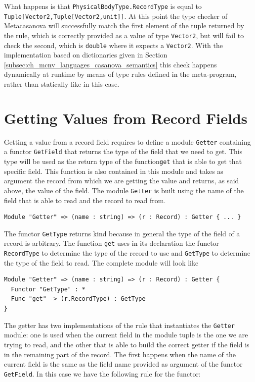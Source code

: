 \noindent
What happens is that \texttt{PhysicalBodyType.RecordType} is equal to\\ \texttt{Tuple[Vector2,Tuple[Vector2,unit]]}. At this point the type checker of Metacasanova will successfully match the first element of the tuple returned by the rule, which is correctly provided as a value of type \texttt{Vector2}, but will fail to check the second, which is \texttt{double} where it expects a \texttt{Vector2}. With the implementation based on dictionaries given in Section \ref{subsec:ch_mcnv_languages_casanova_semantics} this check happens dynamically at runtime by means of type rules defined in the meta-program, rather than statically like in this case.

\section{Getting Values from Record Fields}
\label{sec:ch_functors_record_getter}
Getting a value from a record field requires to define a module \texttt{Getter} containing a functor \texttt{GetField} that returns the type of the field that we need to get. This type will be used as the return type of the function\texttt{get} that is able to get that specific field. This function is also contained in this module and takes as argument the record from which we are getting the value and returns, as said above, the value of the field. The module \texttt{Getter} is built using the name of the field that is able to read and the record to read from.

\begin{lstlisting}
Module "Getter" => (name : string) => (r : Record) : Getter { ... }
\end{lstlisting}

The functor \texttt{GetType} returns kind because in general the type of the field of a record is arbitrary. The function \texttt{get} uses in its declaration the functor \texttt{RecordType} to determine the type of the record to use and \texttt{GetType} to determine the type of the field to read. The complete module will look like

\begin{lstlisting}
Module "Getter" => (name : string) => (r : Record) : Getter {
  Functor "GetType" : *
  Func "get" -> (r.RecordType) : GetType
}
\end{lstlisting}

\noindent
The getter has two implementations of the rule that instantiates the \texttt{Getter} module: one is used when the current field in the module tuple is the one we are trying to read, and the other that is able to build the correct getter if the field is in the remaining part of the record. The first happens when the name of the current field is the same as the field name provided as argument of the functor \texttt{GetField}. In this case we have the following rule for the functor:

